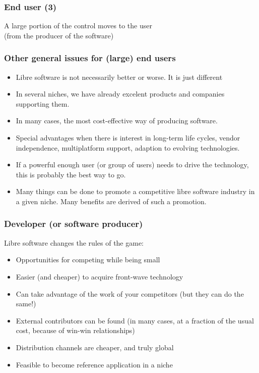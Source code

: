 
\begin{frame}
\frametitle{End user (3)}

\begin{center}
{\LARGE A large portion of the control moves to the user \\
(from the producer of the software)}
\end{center}
\end{frame}


\begin{frame}
\frametitle{Other general issues for (large) end users}

\begin{itemize}
\item Libre software is not necessarily better or worse. It is 
  just different
\item In several niches, we have already excelent products and
  companies supporting them.
\item In many cases, the most cost-effective way of producing
  software.
\item Special advantages when there is interest in long-term life
  cycles, vendor independence, multiplatform support, adaption to
  evolving technologies.
\item If a powerful enough user (or group of users) needs to drive the
  technology, this is probably the best way to go.
\item Many things can be done to promote a competitive
  libre software industry in a given niche. Many benefits
  are derived of such a promotion.
\end{itemize}
\end{frame}


\begin{frame}
\frametitle{Developer (or software producer)}

Libre software changes the rules of the game:

\begin{itemize}
\item Opportunities for competing while being small
\item Easier (and cheaper) to acquire front-wave technology
\item Can take advantage of the work of your competitors (but they can do the same!)
\item External contributors can be found (in many cases, at a fraction of the usual cost, because of win-win relationships)
\item Distribution channels are cheaper, and truly global
\item Feasible to become reference application in a niche
\end{itemize}
\end{frame}


